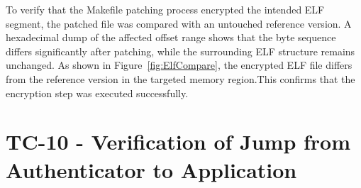 To verify that the Makefile patching process encrypted the intended ELF segment, the patched file was compared with an untouched reference version. A hexadecimal dump of the affected offset range shows that the byte sequence differs significantly after patching, while the surrounding ELF structure remains unchanged. As shown in Figure~\ref{fig:ElfCompare}, the encrypted ELF file differs from the reference version in the targeted memory region.This confirms that the encryption step was executed successfully.

\newpage
\section{TC-10 - Verification of Jump from Authenticator to Application}
\label{sec:tc12}

\renewcommand{\arraystretch}{1.4}

